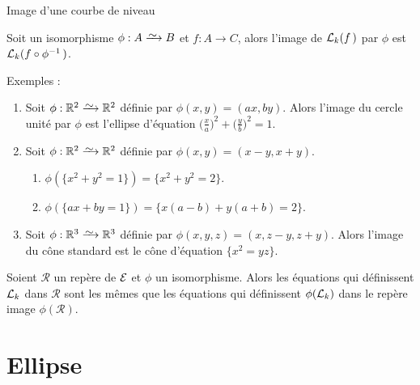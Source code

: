 \documentclass[11pt]{m53beamer}
\begin{document}
\begin{frame}{Image d'une courbe de niveau}
  \begin{proposition}
    Soit un isomorphisme $\phi:A\isoto B$ et $f:A\to C$, alors l'image de $\mathcal{L}_{k}(f\,)$ par $\phi$ est $\mathcal{L}_{k}(f\circ \phi^{-1}\,)$.
  \end{proposition}\pause
  Exemples :
  \begin{enumerate}[<+(1)->]
  \item Soit $\phi:\mathbb{R}^{2}\isoto\mathbb{R}^{2}$ définie par $\phi(x,y)=(ax,by)$. Alors l'image du cercle unité par $\phi$ est l'ellipse d'équation $\big(\frac{x}{a}\big)^{2}+\big(\frac{y}{b}\big)^{2}=1$.
  \item Soit $\phi:\mathbb{R}^{2}\isoto\mathbb{R}^{2}$ définie par $\phi(x,y)=(x-y,x+y)$.
    \begin{enumerate}[<+(1)->]
      \item $\phi(\{x^{2}+y^{2}=1\}) = \{x^{2}+y^{2}=2\}$.
      \item $\phi(\{ax+by=1\}) = \{x(a-b)+y(a+b)=2\}$.
    \end{enumerate}\pause
  \item Soit $\phi:\mathbb{R}^{3}\isoto\mathbb{R}^{3}$ définie par $\phi(x,y,z)=(x,z-y,z+y)$.\pause{} Alors l'image du cône standard est le cône d'équation $\{x^{2}=yz\}$.
  \end{enumerate}\pause
  \begin{proposition}
    Soient $\mathcal{R}$ un repère de $\mathcal{E}$ et $\phi$ un isomorphisme.\pause{} Alors les équations qui définissent $\mathcal{L}_{k}$ dans $\mathcal{R}$ sont les mêmes que les équations qui définissent $\phi(\mathcal{L}_{k})$ dans le repère image $\phi(\mathcal{R})$.
  \end{proposition}
\end{frame}

\section{Ellipse}
\end{document}
